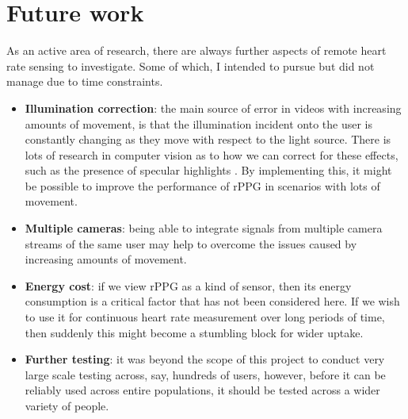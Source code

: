 \section{Future work}
%
As an active area of research, there are always further aspects of remote heart rate sensing to investigate. Some of which, I intended to pursue but did
not manage due to time constraints.
\begin{itemize}
    \item \textbf{Illumination correction}: the main source of error in videos with increasing amounts of movement, is that the illumination incident onto the user is constantly changing 
     as they move with respect to the light source. There is lots of research in computer vision as to how we can correct for these effects, such as the presence of 
     specular highlights \cite{spec1}\cite{spec2}\cite{spec3}. By implementing this, it might be possible to improve the performance of rPPG in scenarios with lots of movement.
     \item \textbf{Multiple cameras}: being able to integrate signals from multiple camera streams of the same user may help to overcome the issues caused by increasing amounts of movement.
    \item \textbf{Energy cost}: if we view rPPG as a kind of sensor, then its energy consumption is a critical factor that has not been considered here. 
    If we wish to use it for continuous heart rate measurement over long periods of time, then suddenly this might become a stumbling block for wider uptake.
     \item \textbf{Further testing}: it was beyond the scope of this project to conduct very large scale testing across, say, hundreds of users, however, before it can be reliably used across entire populations, it should be tested across a wider variety of people.
\end{itemize}